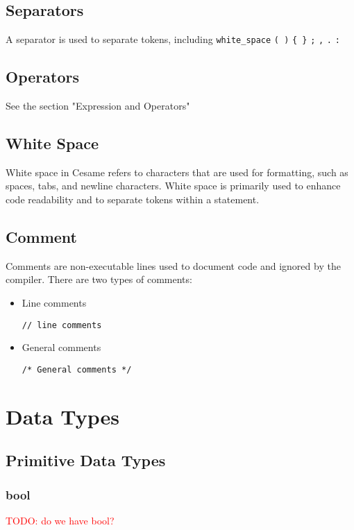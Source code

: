 \documentclass[11pt,A4]{article}
\newcommand{\todo}[1]{\textcolor{red}{#1}}
\begin{document}
        \subsection{Separators}
        A separator is used to separate tokens, including \texttt{white\_space} \texttt{( )} \texttt{\{ \}} \texttt{;} \texttt{,} \texttt{.} \texttt{:}

        \subsection{Operators}
        See the section "Expression and Operators"
        
        \subsection{White Space}
        White space in Cesame refers to characters that are used for formatting, such as spaces, tabs, and newline characters. White space is primarily used to enhance code readability and to separate tokens within a statement. 
        
        \subsection{Comment}
        Comments are non-executable lines used to document code and ignored by the compiler. There are two types of comments:
        \begin{itemize}
            \item Line comments
                \begin{lstlisting}
// line comments 
                \end{lstlisting}
            \item General comments
                \begin{lstlisting}
/* General comments */ 
                \end{lstlisting}
        \end{itemize}

    \newpage
    \section{Data Types}
        \subsection{Primitive Data Types}
            \subsubsection{bool}
            \todo{TODO: do we have bool?}
            
\end{document}
